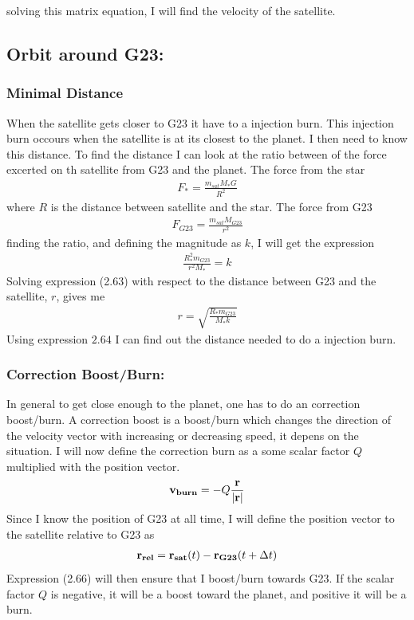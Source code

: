 \documentclass[a4paper,11pt,english]{report}
\begin{document}
  solving this matrix equation, I will find the velocity of the satellite. 
  \subsection{Orbit around G23:}
\subsubsection{Minimal Distance}
When the satellite gets closer to G23 it have to
a injection burn. This injection burn occours when the satellite is at its
closest to the planet. I then need to know this distance. To find the distance
I can look at the ratio between of the force excerted on th satellite from G23
and the planet. The force from the star
\begin{align}
  F_{*} = \frac{m_{sat}M_{*}G}{R^{2}}
\end{align}
where \(R\) is the distance between satellite and the star. The force from G23
\begin{align}
  F_{G23} = \frac{m_{sat}M_{G23}}{r^{2}}
\end{align}
finding the ratio, and defining the magnitude as \(k\), I will get the
expression
\begin{align}
  \frac{R^{2}_{*}m_{G23}}{r^{2}M_{*}} = k
\end{align}
Solving expression (2.63) with respect to the distance between G23 and the
satellite, \(r\), gives me
\begin{align}
  r = \sqrt{\frac{R_{*}m_{G23}}{M_{*}k}}
\end{align}
Using expression \(2.64\) I can find out the distance needed to do a injection
burn.
\subsubsection{Correction Boost/Burn:} In general to get close enough to the planet,
one has to do an correction boost/burn. A correction boost is a boost/burn which changes
the direction of the velocity vector with increasing or decreasing speed, it
depens on the situation. I will now define the correction burn as a some scalar
factor \(Q\) multiplied with the position vector.
\begin{align}
  \bold{v_{burn}} = -Q\frac{\bold{r}}{|\bold{r}|}
\end{align}
Since I know the position of G23 at all time, I will define the position vector
to the satellite relative to G23 as
\begin{align}
  \bold{r_{rel}} = \bold{r_{sat}}(t) - \bold{r_{G23}}(t+\Delta t)
\end{align}
Expression (2.66) will then ensure that I boost/burn towards G23. If the scalar
factor \(Q\) is negative, it will be a boost toward the planet, and positive it
will be a burn.
\end{document}
